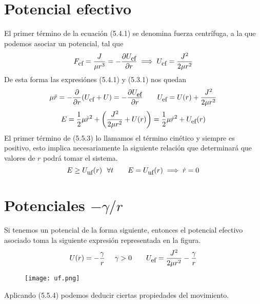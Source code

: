 \section{Potencial efectivo} 
El primer término de la ecuación (5.4.1) se denomina fuerza centrífuga, a la que podemos asociar un potencial, tal que 
\begin{equation} \label{5.1.28}
    F_{\mbox{\small cf}} = \frac{J}{\mu r^3} = -\frac{\partial U_{\mbox{\small cf}}}{\partial r} \implies U_{\mbox{\small cf}} = \frac{J^2}{2\mu r^2}
\end{equation} 
De esta forma las expresiónes (5.4.1) y (5.3.1) nos quedan
\begin{equation} \label{5.1.29}
    \mu \ddot{r} = -\frac{\partial}{\partial r} (U_{\mbox{\small cf}}+U) = -\frac{\partial U_{\mbox{\small ef}}}{\partial r} \ \ \ \ \ \  U_{\mbox{\small ef}} = U(r) + \frac{J^2}{2\mu r^2}
\end{equation} 
\begin{equation} \label{5.1.29}
    E = \frac{1}{2}\mu \dot{r}^2 + \left(\frac{J^2}{2\mu r^2}+U(r)\right) = \frac{1}{2}\mu\dot{r}^2 + U_{\mbox{\small ef}}(r)
\end{equation} 
El primer término de (5.5.3) lo llamamos el término cinético y siempre es positivo, esto implica necesariamente la siguiente relación que determinará que valores de $r$ podrá tomar el sistema.
\begin{equation} \label{5.1.30}
    E\geq U_{\mbox{\small uf}}(r) \ \ \forall t \ \ \ \ \ \ E = U_{\mbox{\small uf}}(r) \implies \dot{r}=0
\end{equation} 


\clearpage
\section{Potenciales $-\gamma/r$}
Si tenemos un potencial de la forma siguiente, entonces el potencial efectivo asociado toma la siguiente expresión representada en la figura.
\begin{equation} \label{5.6.1}
    U(r) = -\frac{\gamma}{r} \ \ \ \ \gamma>0 \ \ \ \ \ \ U_{\mbox{\small ef}} =  \frac{J^2}{2\mu r^2} -\frac{\gamma}{r}
\end{equation} 
\begin{figure}[h]
    \texttt{[image: uf.png]}
\end{figure}
Aplicando (5.5.4) podemos deducir ciertas propiedades del movimiento.

